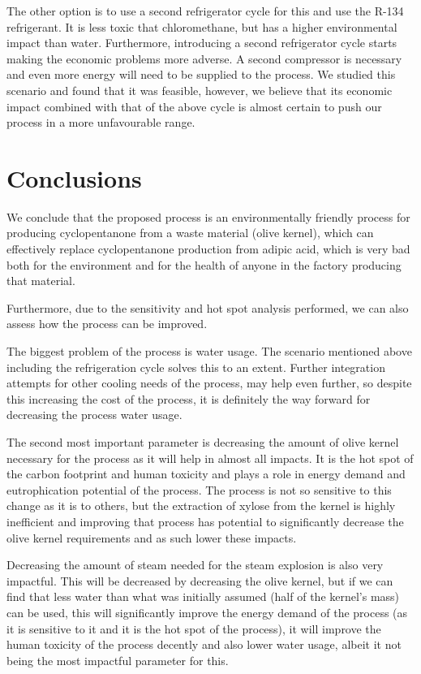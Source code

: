 \documentclass[11pt]{article}
\begin{document}
The other option is to use a second refrigerator cycle for this and use the R-134 refrigerant. It is less toxic that chloromethane, but has a higher environmental impact than water. Furthermore, introducing a second refrigerator cycle starts making the economic problems more adverse. A second compressor is necessary and even more energy will need to be supplied to the process. We studied this scenario and found that it was feasible, however, we believe that its economic impact combined with that of the above cycle is almost certain to push our process in a more unfavourable range.

\section{Conclusions}
\label{sec:org2e12368}
We conclude that the proposed process is an environmentally friendly process for producing cyclopentanone from a waste material (olive kernel), which can effectively replace cyclopentanone production from adipic acid, which is very bad both for the environment and for the health of anyone in the factory producing that material.

Furthermore, due to the sensitivity and hot spot analysis performed, we can also assess how the process can be improved.

The biggest problem of the process is water usage. The scenario mentioned above including the refrigeration cycle solves this to an extent. Further integration attempts for other cooling needs of the process, may help even further, so despite this increasing the cost of the process, it is definitely the way forward for decreasing the process water usage.

The second most important parameter is decreasing the amount of olive kernel necessary for the process as it will help in almost all impacts. It is the hot spot of the carbon footprint and human toxicity and plays a role in energy demand and eutrophication potential of the process. The process is not so sensitive to this change as it is to others, but the extraction of xylose from the kernel is highly inefficient and improving that process has potential to significantly decrease the olive kernel requirements and as such lower these impacts.

Decreasing the amount of steam needed for the steam explosion is also very impactful. This will be decreased by decreasing the olive kernel, but if we can find that less water than what was initially assumed (half of the kernel's mass) can be used, this will significantly improve the energy demand of the process (as it is sensitive to it and it is the hot spot of the process), it will improve the human toxicity of the process decently and also lower water usage, albeit it not being the most impactful parameter for this.
\end{document}
